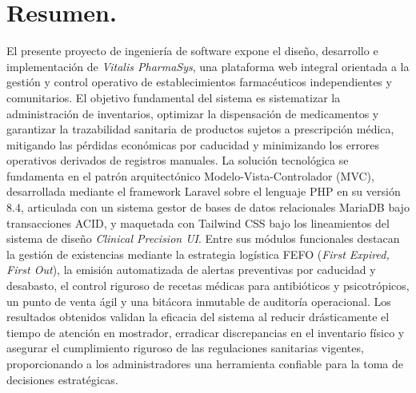 \section*{Resumen.}

El presente proyecto de ingeniería de software expone el diseño, desarrollo e implementación de \textit{Vitalis PharmaSys}, una plataforma web integral orientada a la gestión y control operativo de establecimientos farmacéuticos independientes y comunitarios. El objetivo fundamental del sistema es sistematizar la administración de inventarios, optimizar la dispensación de medicamentos y garantizar la trazabilidad sanitaria de productos sujetos a prescripción médica, mitigando las pérdidas económicas por caducidad y minimizando los errores operativos derivados de registros manuales. La solución tecnológica se fundamenta en el patrón arquitectónico Modelo-Vista-Controlador (MVC), desarrollada mediante el framework Laravel sobre el lenguaje PHP en su versión 8.4, articulada con un sistema gestor de bases de datos relacionales MariaDB bajo transacciones ACID, y maquetada con Tailwind CSS bajo los lineamientos del sistema de diseño \textit{Clinical Precision UI}. Entre sus módulos funcionales destacan la gestión de existencias mediante la estrategia logística FEFO (\textit{First Expired, First Out}), la emisión automatizada de alertas preventivas por caducidad y desabasto, el control riguroso de recetas médicas para antibióticos y psicotrópicos, un punto de venta ágil y una bitácora inmutable de auditoría operacional. Los resultados obtenidos validan la eficacia del sistema al reducir drásticamente el tiempo de atención en mostrador, erradicar discrepancias en el inventario físico y asegurar el cumplimiento riguroso de las regulaciones sanitarias vigentes, proporcionando a los administradores una herramienta confiable para la toma de decisiones estratégicas.
